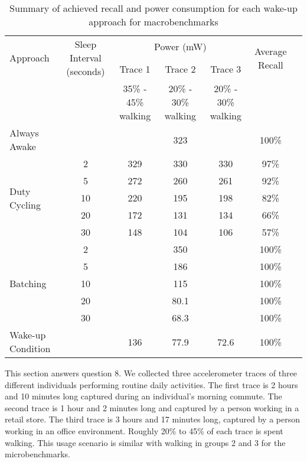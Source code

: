 \begin{table*}[t]
    \begin{tabular}{|l|c|c|c|c|c|c|}
    \hline
	\multirow{2}{*}{Approach}		& \multirow{2}{*}{\parbox{2.2cm}{Sleep Interval (seconds)}}
												& \multicolumn{3}{c|}{\parbox{1.2cm}{Power (mW)}}
																								& \multirow{2}{*}{\parbox{1.5cm}{Average Recall}} \\ \cline{3-5}
									&			& Trace 1		& Trace 2		& Trace 3 		& 							\\ 
									&			& 35\% - 45\% walking	& 20\% - 30\% walking		& 20\% - 30\% walking		& \\ \hline
	Always Awake					& 			& \multicolumn{3}{c|}{323} 						& 100\% \\ \hline
	\multirow{5}{*}{Duty Cycling}	& 2			& 329			& 330			& 330			& 97\%	\\ \cline{2-6}
									& 5			& 272			& 260			& 261			& 92\%	\\ \cline{2-6}
									& 10		& 220			& 195			& 198			& 82\%	\\ \cline{2-6}
									& 20		& 172			& 131			& 134			& 66\%	\\ \cline{2-6}
									& 30		& 148			& 104			& 106			& 57\%	\\ \hline
	\multirow{5}{*}{Batching}		& 2			& \multicolumn{3}{c|}{350} 						& 100\% \\ \cline{2-6}
									& 5			& \multicolumn{3}{c|}{186} 						& 100\% \\ \cline{2-6}
	 								& 10		& \multicolumn{3}{c|}{115} 						& 100\% \\ \cline{2-6}
	 								& 20		& \multicolumn{3}{c|}{80.1} 					& 100\% \\ \cline{2-6}
	 								& 30		& \multicolumn{3}{c|}{68.3} 					& 100\% \\ \hline
	Wake-up Condition				&			& 136			& 77.9			& 72.6			& 100\% \\ \hline
    \end{tabular}
	\caption{Summary of achieved recall and power consumption for each wake-up approach for macrobenchmarks}
	\label{table:macrobenchmarks}
\end{table*}

This section answers question 8. We collected three accelerometer traces of three different individuals performing routine daily activities. The first trace is 2 hours and 10 minutes long captured during an individual's morning commute. The second trace is 1 hour and 2 minutes long and captured by a person working in a retail store. The third trace is 3 hours and 17 minutes long, captured by a person working in an office environment. Roughly 20\% to 45\% of each trace is spent walking. This usage scenario is similar with walking in groups 2 and 3 for the microbenchmarks. 

